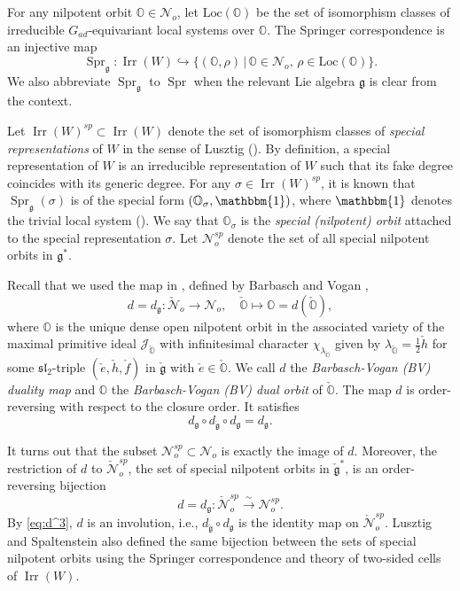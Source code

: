 \documentclass[11pt, a4paper]{amsart}
\newcommand{\J}{\mathcal{J}}
\newcommand{\g}{\mathfrak{g}}
\newcommand{\orb}{\mathbb{O}}
\newcommand{\fg}{\mathfrak{g}}
\newcommand{\ckfg}{{\check{\fg}}}
\newcommand{\ckorb}{\check{\orb}}
\newcommand{\cN}{\mathcal{N}}
\DeclareMathOperator{\spr}{Spr}
\newcommand{\slf}{\mathfrak{sl}}
\newcommand{\Irr}{\operatorname{Irr}}
\theoremstyle{definition}
\numberwithin{equation}{section}
\begin{document}
For any nilpotent orbit $\orb \in \cN_o$, let $\mathrm{Loc}(\orb)$ be the set of isomorphism classes of irreducible $G_{ad}$-equivariant local systems over $\orb$. The Springer correspondence is an injective map
\[ 
\spr_\g : \Irr(W) \hookrightarrow \{ (\orb, \rho) \,|\, \orb \in \cN_o, \, \rho \in \mathrm{Loc}(\orb) \}. 
\]
We also abbreviate $\spr_\g$ to $\spr$ when the relevant Lie algebra $\g$ is clear from the context.

Let $\Irr(W)^{sp} \subset \Irr(W)$ denote the set of isomorphism classes of {\it special representations} of $W$ in the sense of Lusztig (\cite{Lusztig:irred_Weyl_I,Lusztig:irred_Weyl_II}). By definition, a special representation of $W$ is an irreducible representation of $W$ such that its fake degree coincides with its generic degree. 
For any $\sigma \in \Irr(W)^{sp}$, it is known that $\spr_\g(\sigma)$ is of the special form $(\orb_\sigma, \mathbbm{1})$, where $\mathbbm{1}$ denotes the trivial local system (\cite{Lusztig:irred_Weyl_I}). We say that $\orb_\sigma$ is the \emph{special (nilpotent) orbit} attached to the special representation $\sigma$. Let $\cN_o^{sp}$ denote the set of all special nilpotent orbits in $\g^*$. 

Recall that we used the map in , defined by Barbasch and Vogan \cite{BV85:unipotent},
	\[ d = d_{\fg}: \check{\cN}_o \to \cN_o, \quad \ckorb \mapsto \orb = d(\ckorb), \]
where $\orb$ is the unique dense open nilpotent orbit in the associated variety of the maximal primitive ideal $\J_{\ckorb}$ with infinitesimal character $\chi_{\lambda_{\ckorb}}$ given by $\lambda_{\ckorb} = \frac{1}{2} \check{h}$ for some $\slf_2$-triple $(\check{e}, \check{h}, \check{f})$ in $\ckfg$ with $\check{e} \in \ckorb$. We call $d$ the {\it Barbasch-Vogan (BV) duality map} and $\orb$ the {\it Barbasch-Vogan (BV) dual orbit} of $\ckorb$.
The map $d$ is order-reversing with respect to the closure order. It satisfies 
\begin{equation} \label{eq:d^3}
	d_{\fg} \circ d_{\ckfg} \circ d_{\fg} = d_{\fg}. 
\end{equation}

It turns out that the subset $\cN_o^{sp} \subset \cN_o$ is exactly the image of $d$. Moreover, the restriction of $d$ to $\check{\cN}_o^{sp}$, the set of special nilpotent orbits in $\ckfg^*$, is an order-reversing bijection
\begin{equation} \label{eq:duality_sp}
	d = d_{\fg}: \check{\cN}_o^{sp} \xrightarrow{\sim} \cN_o^{sp}. 
\end{equation}
By \eqref{eq:d^3}, $d$ is an involution, i.e., $d_{\ckfg} \circ d_{\fg}$ is the identity map on $\check{\cN}_o^{sp}$.
Lusztig and Spaltenstein \cite{Spaltenstein} also defined the same bijection between the sets of special nilpotent orbits using the Springer correspondence and theory of two-sided cells of $\Irr(W)$. 
\end{document}
